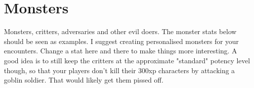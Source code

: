 

\raggedbottom






\chapter*{Monsters}

Monsters, critters, adversaries and other evil doers. The monster stats below should be seen as examples. I suggest creating personalised monsters for your encounters. Change a stat here and there to make things more interesting. A good idea is to still keep the critters at the approximate "standard" potency level though, so that your players don't kill their 300xp characters by attacking a goblin soldier. That would likely get them pissed off.









